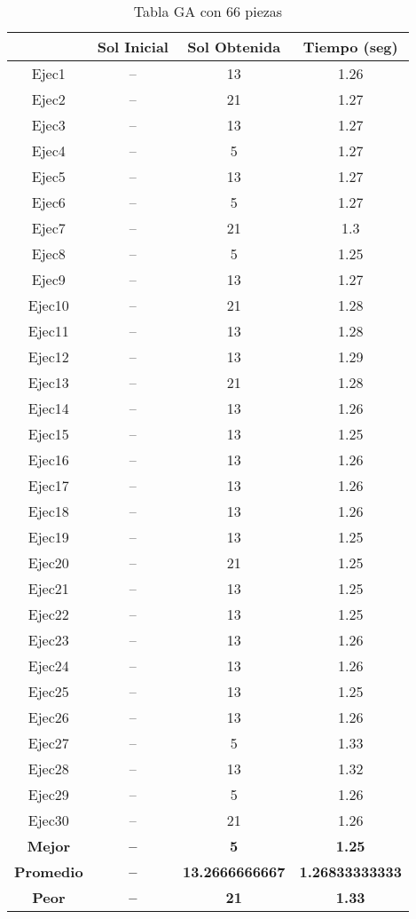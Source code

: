 \begin{center}
\begin{table}
\end{table}

\begin{table}

\begin{tabular}{|c|c|c|c|}
\hline
 & {\bf Sol Inicial} & {\bf Sol Obtenida} & {\bf Tiempo (seg)} \\
\hline
Ejec1 & -- & 13  & 1.26 \\
\hline
Ejec2 & -- & 21  & 1.27 \\
\hline
Ejec3 & -- & 13  & 1.27 \\
\hline
Ejec4 & -- & 5  & 1.27 \\
\hline
Ejec5 & -- & 13  & 1.27 \\
\hline
Ejec6 & -- & 5  & 1.27 \\
\hline
Ejec7 & -- & 21  & 1.3 \\
\hline
Ejec8 & -- & 5  & 1.25 \\
\hline
Ejec9 & -- & 13  & 1.27 \\
\hline
Ejec10 & -- & 21  & 1.28 \\
\hline
Ejec11 & -- & 13  & 1.28 \\
\hline
Ejec12 & -- & 13  & 1.29 \\
\hline
Ejec13 & -- & 21  & 1.28 \\
\hline
Ejec14 & -- & 13  & 1.26 \\
\hline
Ejec15 & -- & 13  & 1.25 \\
\hline
Ejec16 & -- & 13  & 1.26 \\
\hline
Ejec17 & -- & 13  & 1.26 \\
\hline
Ejec18 & -- & 13  & 1.26 \\
\hline
Ejec19 & -- & 13  & 1.25 \\
\hline
Ejec20 & -- & 21  & 1.25 \\
\hline
Ejec21 & -- & 13  & 1.25 \\
\hline
Ejec22 & -- & 13  & 1.25 \\
\hline
Ejec23 & -- & 13  & 1.26 \\
\hline
Ejec24 & -- & 13  & 1.26 \\
\hline
Ejec25 & -- & 13  & 1.25 \\
\hline
Ejec26 & -- & 13  & 1.26 \\
\hline
Ejec27 & -- & 5  & 1.33 \\
\hline
Ejec28 & -- & 13  & 1.32 \\
\hline
Ejec29 & -- & 5  & 1.26 \\
\hline
Ejec30 & -- & 21  & 1.26 \\
\hline
{\bf Mejor} & {\bf -- } & {\bf 5} & {\bf 1.25} \\
\hline
{\bf Promedio} & {\bf -- } & {\bf 13.2666666667} & {\bf 1.26833333333} \\
\hline
{\bf Peor} & {\bf -- } & {\bf 21} & {\bf 1.33} \\
\hline
\end{tabular}
\caption{Tabla GA con 66 piezas}


\end{table}
\end{center}
